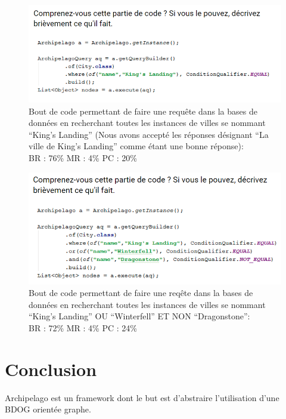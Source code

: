 \documentclass[a4paper,fleqn,12pt,oneside]{report}
\begin{document}
\begin{figure}[!ht]
\centering
\includegraphics[scale=1]{figures/Snippet3.png}
\caption{Bout de code permettant de faire une requête dans la bases de données en recherchant toutes les instances de villes se nommant \enquote{King's Landing} (Nous avons accepté les réponses désignant \enquote{La ville de King's Landing} comme étant une bonne réponse):\\BR : 76\% MR : 4\% PC : 20\% }
\label{fig:Snippet3}
\end{figure}

\begin{figure}[!ht]
\centering
\includegraphics[scale=1]{figures/Snippet4.png}
\caption{Bout de code permettant de faire une reqête dans la bases de données en recherchant toutes les instances de villes se nommant \enquote{King's Landing} OU \enquote{Winterfell} ET NON \enquote{Dragonstone}:\\BR : 72\% MR : 4\% PC : 24\% }
\label{fig:Snippet4}
\end{figure}

\chapter{Conclusion}

Archipelago est un framework dont le but est d'abstraire l'utilisation d'une BDOG orientée graphe. 
\end{document}
